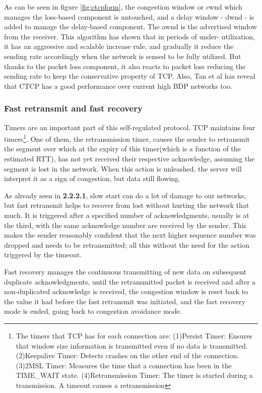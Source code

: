 As can be seen in figure \ref{fig:ctcpform}, the congestion window or cwnd
which manages the loss-based component is untouched, and a delay window - dwnd
- is added to manage the delay-based component.  The awnd is the advertised
window from the receiver. This algorithm has shown that in periods of under-
utilization, it has an aggressive and scalable increase rule, and gradually it
reduce the sending rate accordingly when the network is sensed to be fully
utilized. But thanks to the packet loss component, it also reacts to packet
loss reducing the sending rate to keep the conservative property of TCP. Also,
Tan et al \cite{Tan06compoundtcp} has reveal that CTCP has a good performance
over current high BDP networks too.

\subsubsection{Fast retransmit and fast recovery} 
Timers are an important part of this self-regulated protocol. TCP maintains
four timers\footnote{The timers that TCP has for each connection are:
(1)Persist Timer: Ensures that window size information is transmitted even  if
no data is transmitted. (2)Keepalive Timer: Detects crashes on the other end
of the connection. (3)2MSL Timer: Measures the time that a connection has been
in the TIME\_WAIT state. (4)Retransmission Timer: The timer is started during
a transmission. A timeout causes a retransmission}. One of them, the
retransmission timer, causes the sender to retransmit the segment over which
at the expiry of this timer(which is a function of the estimated RTT), has not
yet received their respective acknowledge, assuming the segment is lost in the
network. When this action is unleashed, the server will interpret it as a sign
of congestion, but data still flowing.

As already seen in \textbf{2.2.2.1}, slow start can do a lot of damage to our
networks, but fast retransmit helps to recover from lost without hurting the
network that much. It is triggered after a specified number of
acknowledgments, usually is at the third, with the same acknowledge number are
received by the sender. This makes the sender reasonably confident that
the next higher sequence number was dropped and needs to be retransmitted; all
this without the need for the action triggered by the timeout.

Fast recovery manages the continuous transmitting of new data on subsequent
duplicate acknowledgments, until the retransmitted packet is received and
after a non-duplicated acknowledge is received, the congestion window is reset
back to the value it had before the fast retransmit was initiated, and the
fast recovery mode is ended, going back to congestion avoidance mode.
